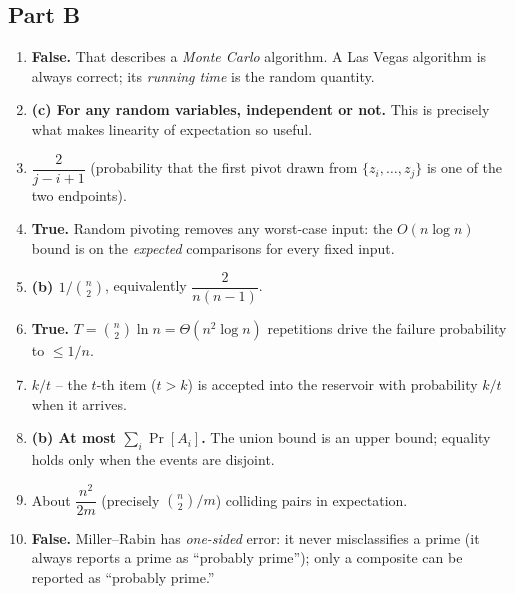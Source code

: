 \documentclass[11pt]{article}
\begin{document}
\subsection*{Part B}

\begin{enumerate}[label=\textbf{B\arabic*.}, leftmargin=2.2em]

\item \textbf{False.} That describes a \emph{Monte Carlo} algorithm. A Las Vegas algorithm
is always correct; its \emph{running time} is the random quantity.

\item \textbf{(c) For any random variables, independent or not.} This is precisely what
makes linearity of expectation so useful.

\item $\dfrac{2}{j - i + 1}$ (probability that the first pivot drawn from $\{z_i,\ldots,
z_j\}$ is one of the two endpoints).

\item \textbf{True.} Random pivoting removes any worst-case input: the $O(n\log n)$ bound
is on the \emph{expected} comparisons for every fixed input.

\item \textbf{(b) $1/\binom{n}{2}$}, equivalently $\dfrac{2}{n(n-1)}$.

\item \textbf{True.} $T = \binom{n}{2}\ln n = \Theta(n^2\log n)$ repetitions drive the
failure probability to $\le 1/n$.

\item $k/t$ -- the $t$-th item ($t>k$) is accepted into the reservoir with probability
$k/t$ when it arrives.

\item \textbf{(b) At most $\sum_i \Pr[A_i]$.} The union bound is an upper bound; equality
holds only when the events are disjoint.

\item About $\dfrac{n^2}{2m}$ (precisely $\binom{n}{2}/m$) colliding pairs in expectation.

\item \textbf{False.} Miller--Rabin has \emph{one-sided} error: it never misclassifies a
prime (it always reports a prime as ``probably prime''); only a composite can be reported
as ``probably prime.''

\end{enumerate}
\end{document}
